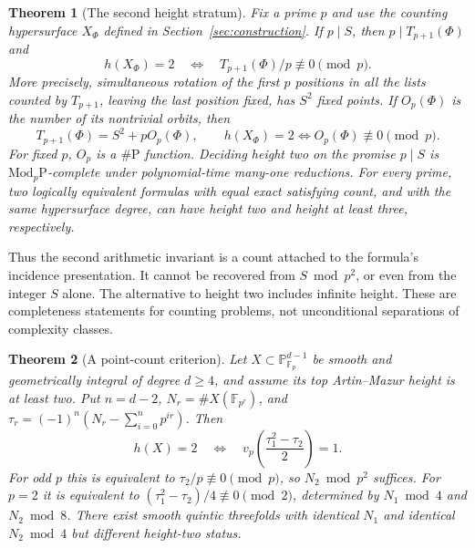 \documentclass[11pt]{article}
\newtheorem{theorem}{Theorem}[section]
\theoremstyle{definition}
\begin{document}
\begin{theorem}[The second height stratum]\label{thm:intro-second}
Fix a prime $p$ and use the counting hypersurface $X_\Phi$ defined in
Section~\ref{sec:construction}. If $p\mid S$, then $p\mid T_{p+1}(\Phi)$
and
\[
 h(X_\Phi)=2\quad\Longleftrightarrow\quad
 T_{p+1}(\Phi)/p\not\equiv0\pmod p.
\]
More precisely, simultaneous rotation of the first $p$ positions in
all the lists counted by $T_{p+1}$, leaving the last position fixed,
has $S^2$ fixed points. If $O_p(\Phi)$ is the number of its nontrivial
orbits, then
\[
 T_{p+1}(\Phi)=S^2+pO_p(\Phi),\qquad
 h(X_\Phi)=2\Longleftrightarrow O_p(\Phi)\not\equiv0\pmod p.
\]
For fixed $p$, $O_p$ is a $\#\mathrm P$ function.
Deciding height two on the promise $p\mid S$ is
$\mathrm{Mod}_p\mathrm P$-complete under polynomial-time many-one reductions.
For every prime, two logically equivalent formulas with equal exact
satisfying count, and with the same hypersurface degree, can have
height two and height at least three, respectively.
\end{theorem}

Thus the second arithmetic invariant is a count attached to the
formula's incidence presentation. It cannot be recovered from
$S\bmod p^2$, or even from the integer $S$ alone.
The alternative to height two includes infinite height.
These are completeness statements for counting problems, not
unconditional separations of complexity classes.

\begin{theorem}[A point-count criterion]\label{thm:intro-points}
Let $X\subset\mathbb P^{d-1}_{\mathbb F_p}$ be smooth and geometrically
integral of degree $d\ge4$, and assume its top Artin--Mazur height
is at least two. Put $n=d-2$, $N_r=\#X(\mathbb F_{p^r})$, and
$\tau_r=(-1)^n(N_r-\sum_{i=0}^n p^{ir})$.
Then
\[
 h(X)=2\quad\Longleftrightarrow\quad
 v_p\!\left(\frac{\tau_1^2-\tau_2}{2}\right)=1.
\]
For odd $p$ this is equivalent to $\tau_2/p\not\equiv0\pmod p$,
so $N_2\bmod p^2$ suffices. For $p=2$ it is equivalent to
$(\tau_1^2-\tau_2)/4\not\equiv0\pmod2$, determined by
$N_1\bmod4$ and $N_2\bmod8$.
There exist smooth quintic threefolds with identical $N_1$ and
identical $N_2\bmod4$ but different height-two status.
\end{theorem}
\end{document}
